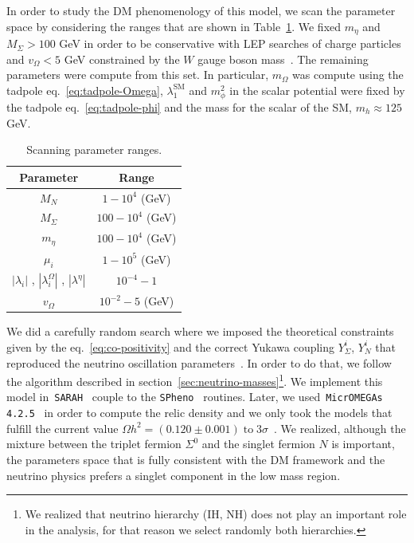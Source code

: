 \documentclass[12pt,letterpaper]{article}
\begin{document}
In order to study the DM phenomenology of this model, we scan the parameter space by considering the ranges that are shown in Table~\ref{tab:scan-parameter}. We fixed $m_{\eta}$ and $M_{\Sigma} > 100$ GeV in order to be conservative with LEP searches of charge particles~\cite{ALEPH:2005ab} and $v_{\Omega}<5$ GeV constrained by the $W$ gauge boson mass~\cite{Agashe:2014kda}. 
The remaining parameters were compute from this set. In particular, $m_{\Omega}$ was compute using the tadpole eq.~\ref{eq:tadpole-Omega}, $\lambda_1^{\text{SM}}$ and $m_{\phi}^2$ in the scalar potential were fixed by the tadpole eq.~\ref{eq:tadpole-phi} and the mass for the scalar of the SM, $m_{h}\approx 125$ GeV.
\begin{table}
\centering
\begin{tabular}{|c|c|}
\hline
Parameter & Range\\
\hline
$M_N$ &  $1-10^4$ (GeV) \\
$M_{\Sigma}$ &  $100-10^4$ (GeV) \\
$m_{\eta}$ &  $100-10^4$ (GeV) \\
$\mu_i$ & $1-10^{5}$ (GeV) \\
$|\lambda_i|$ , $|\lambda_i^{\Omega}|$ , $|\lambda^{\eta}|$ & $10^{-4} - 1$ \\
$v_{\Omega}$ & $10^{-2}- 5$  (GeV)\\
\hline
\end{tabular}
\caption{Scanning parameter ranges.}
\label{tab:scan-parameter}
\end{table}
We did  a carefully random search where we imposed the theoretical constraints given by the eq.~\ref{eq:co-positivity} and the correct Yukawa coupling $Y_{\Sigma}^i$, $Y_N^i$ that reproduced the neutrino oscillation parameters~\cite{Forero:2014bxa, deSalas:2017kay}. 
In order to do that, we follow the algorithm described in section~\ref{sec:neutrino-masses}\footnote{We realized that neutrino hierarchy (IH, NH) does not play an important role in the analysis, for that reason we select randomly both hierarchies.}.
We implement this model in~\texttt{SARAH}~\cite{Staub:2008uz,Staub:2009bi,Staub:2010jh,Staub:2012pb,Staub:2013tta} couple to the \texttt{SPheno}~\cite{Porod:2003um,Porod:2011nf} routines. 
Later, we used~\texttt{MicrOMEGAs 4.2.5}~\cite{Belanger:2006is} in order to compute the relic density and we only took the models that fulfill the current value $\Omega h^2 = (0.120 \pm 0.001)\; \text{to}\; 3\sigma$~\cite{Aghanim:2018eyx}.
We realized, although the mixture between the triplet fermion $\Sigma^0$ and the singlet fermion $N$ is important, the parameters space that is fully consistent with the DM framework and the neutrino physics prefers a singlet component in the low mass region.
\end{document}
